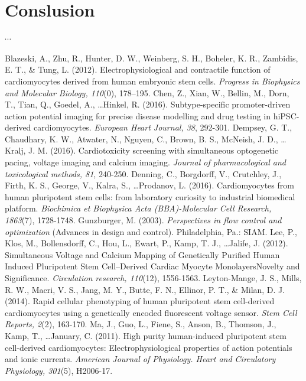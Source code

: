 \documentclass[12pt,a4paper]{article}
\begin{document}
\section{Conslusion} \label{Conclusion}
%
$\cdots$
%
\begin{thebibliography}{99}
 Blazeski, A., Zhu, R., Hunter, D. W., Weinberg, S. H., Boheler, K. R., Zambidis, E. T., \& Tung, L. (2012). Electrophysiological and contractile function of cardiomyocytes derived from human embryonic stem cells. \textit{Progress in Biophysics and Molecular Biology, 110}(0), 178–195.
 Chen, Z., Xian, W., Bellin, M., Dorn, T., Tian, Q., Goedel, A., \ldots Hinkel, R. (2016). Subtype-specific promoter-driven action potential imaging for precise disease modelling and drug testing in hiPSC-derived cardiomyocytes. \textit{European Heart Journal, 38}, 292-301.
 Dempsey, G. T., Chaudhary, K. W., Atwater, N., Nguyen, C., Brown, B. S., McNeish, J. D., \ldots Kralj, J. M. (2016). Cardiotoxicity screening with simultaneous optogenetic pacing, voltage imaging and calcium imaging. \textit{Journal of pharmacological and toxicological methods, 81}, 240-250.
 Denning, C., Borgdorff, V., Crutchley, J., Firth, K. S., George, V., Kalra, S., \ldots Prodanov, L. (2016). Cardiomyocytes from human pluripotent stem cells: from laboratory curiosity to industrial biomedical platform. \textit{Biochimica et Biophysica Acta (BBA)-Molecular Cell Research, 1863}(7), 1728-1748.
 Gunzburger, M. (2003). \textit{Perspectives in flow control and optimization} (Advances in design and control). Philadelphia, Pa.: SIAM.
 Lee, P., Klos, M., Bollensdorff, C., Hou, L., Ewart, P., Kamp, T. J., \ldots Jalife, J. (2012). Simultaneous Voltage and Calcium Mapping of Genetically Purified Human Induced Pluripotent Stem Cell–Derived Cardiac Myocyte MonolayersNovelty and Significance. \textit{Circulation research, 110}(12), 1556-1563.
 Leyton-Mange, J. S., Mills, R. W., Macri, V. S., Jang, M. Y., Butte, F. N., Ellinor, P. T., \& Milan, D. J. (2014). Rapid cellular phenotyping of human pluripotent stem cell-derived cardiomyocytes using a genetically encoded fluorescent voltage sensor. \textit{Stem Cell Reports, 2}(2), 163-170.
 Ma, J., Guo, L., Fiene, S., Anson, B., Thomson, J., Kamp, T., \ldots January, C. (2011). High purity human-induced pluripotent stem cell-derived cardiomyocytes: Electrophysiological properties of action potentials and ionic currents. \textit{American Journal of Physiology. Heart and Circulatory Physiology, 301}(5), H2006-17.

\end{thebibliography}
\end{document}
